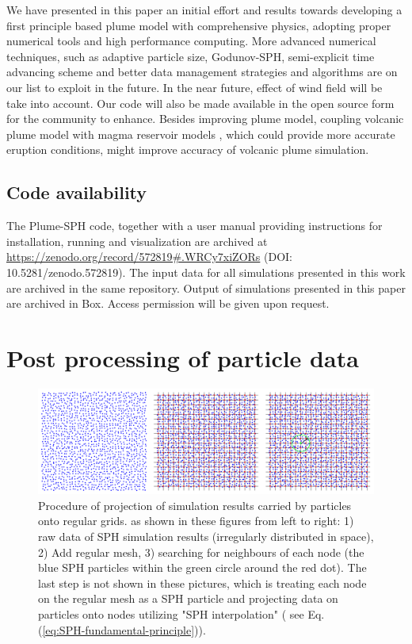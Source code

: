 \documentclass[gmd, manuscript]{copernicus}
\begin{document}
We have presented in this paper an initial effort and results towards developing a first principle based plume model with comprehensive physics, adopting proper numerical tools and high performance computing. More advanced numerical techniques, such as adaptive particle size, Godunov-SPH, semi-explicit time advancing scheme and better data management strategies and algorithms are on our list to exploit in the future. In the near future, effect of wind field will be take into account. Our code will also be made available in the open source form for the community to enhance. Besides improving plume model, coupling volcanic plume model with magma reservoir models \citep[e.g.][]{terray2018new}, which could provide more accurate eruption conditions, might improve accuracy of volcanic plume simulation. 

\subsection{Code availability}
The Plume-SPH code, together with a user manual providing instructions for installation, running and visualization are archived at \url{ https://zenodo.org/record/572819#.WRCy7xiZORs} (DOI: 10.5281/zenodo.572819). The input data for all simulations presented in this work are archived in the same repository. Output of simulations presented in this paper are archived in Box. Access permission will be given upon request.

\appendix
\section{Post processing of particle data} \label{app:project-SPH-grid}    %
\appendixfigures
\begin{figure}[!htb]
    \centering
	\includegraphics[width=18cm]{FigA1} 
    \caption{Procedure of projection of simulation results carried by particles onto regular grids. as shown in these figures from left to right: 1) raw data of SPH simulation results (irregularly distributed in space), 2) Add regular mesh, 3) searching for neighbours of each node (the blue SPH particles within the green circle around the red dot). The last step is not shown in these pictures, which is treating each node on the regular mesh as a SPH particle and projecting data on particles onto nodes utilizing "SPH interpolation" ( see Eq. (\ref{eq:SPH-fundamental-principle})).}
    \label{appfig:1D-shock-tests-verification}
\end{figure}
\end{document}
